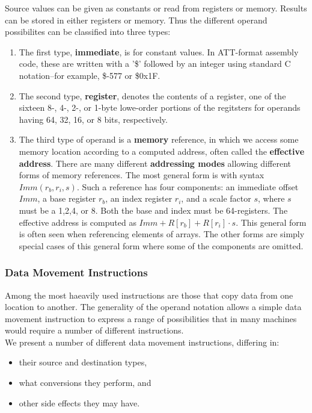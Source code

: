 \documentclass[11pt]{article}
\begin{document}
Source values can be given as constants or read from registers or memory. Results can be stored in either registers or memory. Thus the different operand possibilites can be classified into three types:\\
\begin{enumerate}
\item The first type, \textbf{immediate}, is for constant values. In ATT-format assembly code, these are written with a '\$' followed by an integer using standard C notation--for example, \$-577 or \$0x1F.\\
\item The second type, \textbf{register}, denotes the contents of a register, one of the sixteen 8-, 4-, 2-, or 1-byte lowe-order portions of the regitsters for operands having 64, 32, 16, or 8 bits, respectively.\\
\item The third type of operand is a \textbf{memory} reference, in which we access some memory location according to a computed address, often called the \textbf{effective address}. There are many different \textbf{addressing modes} allowing different forms of memory references. The most general form is with syntax \(Imm(r_b, r_i, s)\). Such a reference has four components: an immediate offset \(Imm\), a base register \(r_b\), an index register \(r_i\), and a scale factor \(s\), where \(s\) must be a 1,2,4, or 8. Both the base and index must be 64-registers. The effective address is computed as \(Imm + R[r_b] + R[r_i] \cdot s\). This general form is often seen when referencing elements of arrays. The other forms are simply special cases of this general form where some of the components are omitted.\\
\end{enumerate}


\subsubsection{Data Movement Instructions}
\label{sec:org4ff190b}
Among the most haeavily used instructions are those that copy data from one location to another. The generality of the operand notation allows a simple data movement instruction to express a range of possibilities that in many machines would require a number of different instructions.\\

We present a number of different data movement instructions, differing in:\\
\begin{itemize}
\item their source and destination types,\\
\item what conversions they perform, and\\
\item other side effects they may have.\\
\end{itemize}
\end{document}
